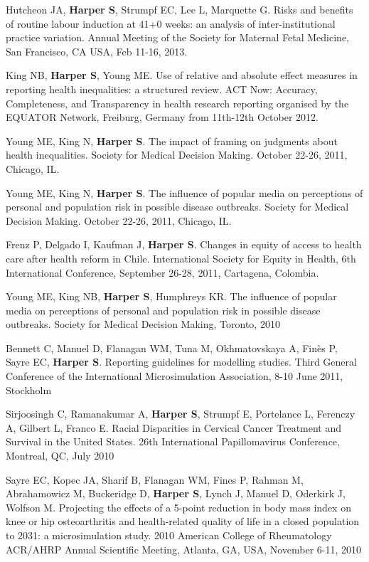 \documentclass[
  letterpaper,
  DIV=11,
  numbers=noendperiod]{scrartcl}
\begin{document}
Hutcheon JA, \textbf{Harper S}, Strumpf EC, Lee L, Marquette G. Risks
and benefits of routine labour induction at 41+0 weeks: an analysis of
inter-institutional practice variation. Annual Meeting of the Society
for Maternal Fetal Medicine, San Francisco, CA USA, Feb 11-16, 2013.

King NB, \textbf{Harper S}, Young ME. Use of relative and absolute
effect measures in reporting health inequalities: a structured review.
ACT Now: Accuracy, Completeness, and Transparency in health research
reporting organised by the EQUATOR Network, Freiburg, Germany from
11th-12th October 2012.

Young ME, King N, \textbf{Harper S}. The impact of framing on judgments
about health inequalities. Society for Medical Decision Making. October
22-26, 2011, Chicago, IL.

Young ME, King N, \textbf{Harper S}. The influence of popular media on
perceptions of personal and population risk in possible disease
outbreaks. Society for Medical Decision Making. October 22-26, 2011,
Chicago, IL.

Frenz P, Delgado I, Kaufman J, \textbf{Harper S}. Changes in equity of
access to health care after health reform in Chile. International
Society for Equity in Health, 6th International Conference, September
26-28, 2011, Cartagena, Colombia.

Young ME, King NB, \textbf{Harper S}, Humphreys KR. The influence of
popular media on perceptions of personal and population risk in possible
disease outbreaks. Society for Medical Decision Making, Toronto, 2010

Bennett C, Manuel D, Flanagan WM, Tuna M, Okhmatovskaya A, Finès P,
Sayre EC, \textbf{Harper S}. Reporting guidelines for modelling studies.
Third General Conference of the International Microsimulation
Association, 8-10 June 2011, Stockholm

Sirjoosingh C, Ramanakumar A, \textbf{Harper S}, Strumpf E, Portelance
L, Ferenczy A, Gilbert L, Franco E. Racial Disparities in Cervical
Cancer Treatment and Survival in the United States. 26th International
Papillomavirus Conference, Montreal, QC, July 2010

Sayre EC, Kopec JA, Sharif B, Flanagan WM, Fines P, Rahman M,
Abrahamowicz M, Buckeridge D, \textbf{Harper S}, Lynch J, Manuel D,
Oderkirk J, Wolfson M. Projecting the effects of a 5-point reduction in
body mass index on knee or hip osteoarthritis and health-related quality
of life in a closed population to 2031: a microsimulation study. 2010
American College of Rheumatology ACR/AHRP Annual Scientific Meeting,
Atlanta, GA, USA, November 6-11, 2010
\end{document}

